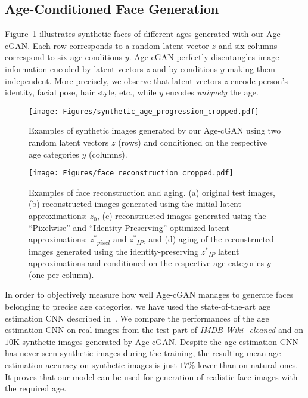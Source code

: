 \documentclass{article}
\begin{document}
\subsection{Age-Conditioned Face Generation}
\label{subsec:age_conditioned_face_generation}

Figure~\ref{fig:face_synthesis} illustrates synthetic faces of different ages generated with our Age-cGAN.
Each row corresponds to a random latent vector $z$ and six columns correspond to six age conditions $y$.
Age-cGAN perfectly disentangles image information encoded by latent vectors $z$ and by conditions $y$ making them independent.
More precisely, we observe that latent vectors $z$ encode person's identity, facial pose, hair style, etc., while $y$ encodes \textit{uniquely} the age.

\begin{figure}[h!]
	\begin{center}
			\texttt{[image: Figures/synthetic\_age\_progression\_cropped.pdf]}
	\end{center}
	\caption{Examples of synthetic images generated by our Age-cGAN using two random latent vectors $z$ (rows) and conditioned on the respective age categories $y$ (columns).}
	\label{fig:face_synthesis}
\end{figure}

\begin{figure*}[t!]
	\begin{center}
			\texttt{[image: Figures/face\_reconstruction\_cropped.pdf]}
	\end{center}
	\caption{Examples of face reconstruction and aging. (a) original test images, (b) reconstructed images generated using the initial latent approximations: $z_{0}$, (c) reconstructed images generated using the ``Pixelwise'' and ``Identity-Preserving'' optimized latent approximations: ${z^{*}}_{pixel}$ and ${z^{*}}_{IP}$, and (d) aging of the reconstructed images generated using the identity-preserving ${z^{*}}_{IP}$ latent approximations and conditioned on the respective age categories $y$ (one per column).}
	\label{fig:face_reconstruction}
\end{figure*}

In order to objectively measure how well Age-cGAN manages to generate faces belonging to precise age categories, we have used the state-of-the-art age estimation CNN described in~\cite{antipov2016apparent}.
We compare the performances of the age estimation CNN on real images from the test part of \textit{IMDB-Wiki\_cleaned} and on $10$K synthetic images generated by Age-cGAN.
Despite the age estimation CNN has never seen synthetic images during the training, the resulting mean age estimation accuracy on synthetic images is just $17$\% lower than on natural ones.
It proves that our model can be used for generation of realistic face images with the required age.
\end{document}
